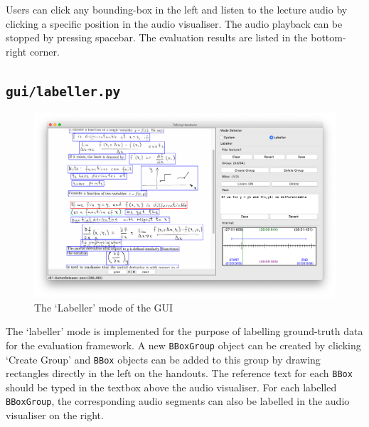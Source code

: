 Users can click any bounding-box in the left and listen to the lecture audio by clicking a specific position in the audio visualiser. The audio playback can be stopped by pressing spacebar. The evaluation results are listed in the bottom-right corner.

\subsection{\texttt{gui/labeller.py}}

\begin{figure}[!ht]
    \centering
    \includegraphics[width=.9\textwidth]{gui-labeller.png}
    \caption{The `Labeller' mode of the GUI}
    \label{fig:gui-labeller}
\end{figure}

The `labeller' mode is implemented for the purpose of labelling ground-truth data for the evaluation framework. A new \texttt{BBoxGroup} object can be created by clicking `Create Group' and \texttt{BBox} objects can be added to this group by drawing rectangles directly in the left on the handouts. The reference text for each \texttt{BBox} should be typed in the textbox above the audio visualiser. For each labelled \texttt{BBoxGroup}, the corresponding audio segments can also be labelled in the audio visualiser on the right.